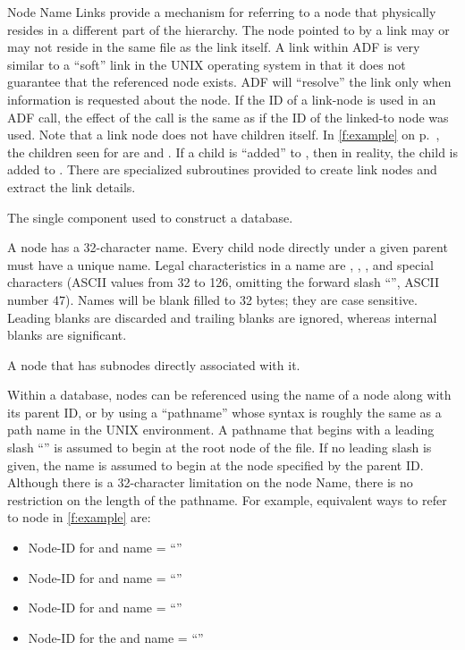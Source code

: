 \begin{Ventryi}{Node Name}
      Links provide a mechanism for referring to a node that physically
      resides in a different part of the hierarchy.
      The node pointed to by a link may or may not reside in the same
      file as the link itself.
      A link within ADF is very similar to a ``soft'' link in the
      UNIX operating system in that it does not guarantee that the
      referenced node exists.
      ADF will ``resolve'' the link only when information is requested
      about the node.
      If the ID of a link-node is used in an ADF call, the effect of
      the call is the same as if the ID of the linked-to node was used.
      Note that a link node does not have children itself.
      In \autoref{f:example} on p.~\pageref*{f:example}, the children
      seen for  are  and .
      If a child is ``added'' to , then in reality, the child
      is added to .
      There are specialized subroutines provided to create link nodes
      and extract the link details.
\item [Node]
      The single component used to construct a database.
\item [Node name]
      A node has a 32-character name.
      Every child node directly under a given parent must have a unique
      name.
      Legal characteristics in a name are , ,
      , and special characters (ASCII values from 32 to
      126, omitting the forward slash ``\key{/}'', ASCII number 47).
      Names will be blank filled to 32 bytes; they are case sensitive.
      Leading blanks are discarded and trailing blanks are ignored,
      whereas internal blanks are significant.
\item [Parent]
      A node that has subnodes directly associated with it.
\item [Pathname]
      Within a database, nodes can be referenced using the name of a node
      along with its parent ID, or by using a ``pathname'' whose syntax is
      roughly the same as a path name in the UNIX environment.
      A pathname that begins with a leading slash ``\key{/}'' is
      assumed to begin at the root node of the file.
      If no leading slash is given, the name is assumed to begin at the
      node specified by the parent ID.
      Although there is a 32-character limitation on the node Name,
      there is no restriction on the length of the pathname.
      For example, equivalent ways to refer to node  in
      \autoref{f:example} are:
      \begin{itemize}
      \item Node-ID for  and name = ``''
      \item Node-ID for  and name = ``''
      \item Node-ID for  and name = ``''
      \item Node-ID for the  and name =
            ``''
      \end{itemize}
\end{Ventryi}

